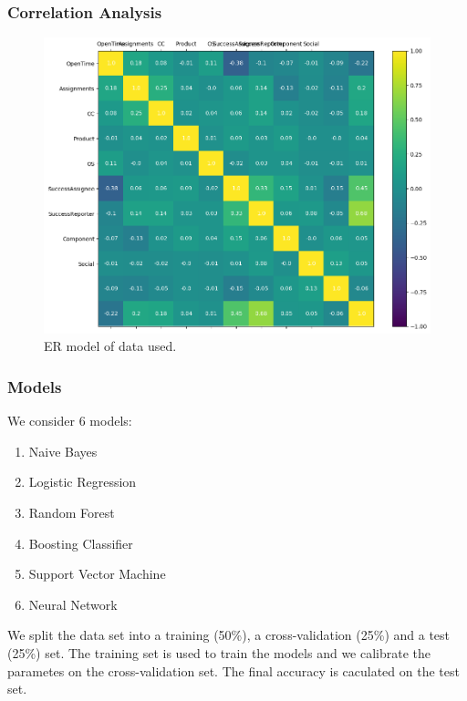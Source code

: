 \documentclass[xcolor=sgvnames,serifs,notes,compress,professionalfont]{beamer}
\begin{document}
\begin{frame}
\frametitle{Correlation Analysis}
\begin{figure}
	\includegraphics[height=0.75\textheight]{pictures/correlations.png}    
	\caption{ER model of data used.}
\end{figure}
\end{frame}

\begin{frame}
\frametitle{Models}
We consider 6 models:
\begin{enumerate}
	\item Naive Bayes
	\item Logistic Regression
	\item Random Forest
	\item Boosting Classifier
	\item Support Vector Machine
	\item Neural Network
\end{enumerate}
We split the data set into a training (50\%), a cross-validation (25\%) and a test (25\%) set. The training set is used to train the models and we calibrate the parametes on the cross-validation set. The final accuracy is caculated on the test set.
\end{frame}
\end{document}
